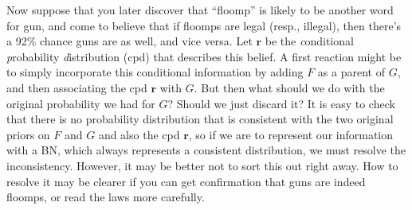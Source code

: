 \documentclass{article}
\theoremstyle{plain}
\theoremstyle{definition}
\newenvironment{example}
	{\pushQED{\qed}\renewcommand{\qedsymbol}{$\triangle$}\examplex}
	{\popQED\endexamplex%
}
\theoremstyle{remark}
\newcommand\mat[1]{\mathbf{#1}}
\numberwithin{equation}{section}
\begin{document}
\begin{example}
		Now suppose that you later discover that ``floomp'' is
                likely to be another word for gun, and come to believe
                that if floomps are legal (resp., illegal), then
                there's a 92\% chance guns are as well, and vice
                versa. Let $\mat r$ be the  
		\emph conditional \emph probability \emph distribution
                                (cpd)
		that describes this belief. A first reaction might be to simply incorporate this conditional information by adding $F$ as a parent of $G$, and then associating the cpd $\mat r$ with $G$. But then what should we do with the original probability we had for $G$?  Should we just discard it?
		It is easy to check that there is no probability distribution that is consistent with the two original priors on $F$ and $G$ and also the cpd $\mat r$, so if we are to represent our information with a BN, which always represents a consistent distribution, we must resolve the inconsistency.  
%		
		However, it may be better not to sort this out right away. How to resolve it may be clearer if you can get confirmation that guns are indeed floomps, or read the laws more carefully.


\end{example}
\end{document}
